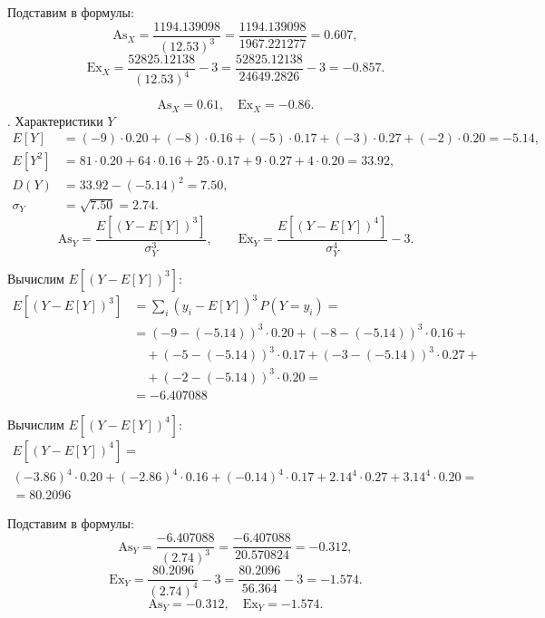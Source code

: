 \documentclass[a4paper,14pt]{extarticle}
\begin{document}
        Подставим в формулы:
        \[
        \mathrm{As}_X = \frac{1194.139098}{(12.53)^3} = \frac{1194.139098}{1967.221277} = 0.607,
        \]
        \[
        \mathrm{Ex}_X = \frac{52825.12138}{(12.53)^4} - 3 = \frac{52825.12138}{24649.2826} - 3 = -0.857.
        \]

        \[
        \boxed{\mathrm{As}_X = 0.61, \quad \mathrm{Ex}_X = -0.86.}
        \]
        . Характеристики $Y$
        \[
        \begin{aligned}
        E[Y] &= (-9)\cdot0.20 + (-8)\cdot0.16 + (-5)\cdot0.17 + (-3)\cdot0.27 + (-2)\cdot0.20 = -5.14,\\
        E[Y^2] &= 81\cdot0.20 + 64\cdot0.16 + 25\cdot0.17 + 9\cdot0.27 + 4\cdot0.20 = 33.92,\\
        D(Y) &= 33.92 - (-5.14)^2 = 7.50,\\
        \sigma_Y &= \sqrt{7.50} = 2.74.
        \end{aligned}
        \]
        \[
        \mathrm{As}_Y = \frac{E[(Y - E[Y])^3]}{\sigma_Y^3}, 
        \qquad
        \mathrm{Ex}_Y = \frac{E[(Y - E[Y])^4]}{\sigma_Y^4} - 3.
        \]

        Вычислим $E[(Y - E[Y])^3]$:
        \[
        \begin{aligned}
        E[(Y - E[Y])^3] &= \sum_i (y_i - E[Y])^3 \, P(Y=y_i) = \\
        &= (-9 - (-5.14))^3 \cdot 0.20 + (-8 - (-5.14))^3 \cdot 0.16 + \\
        &\quad + (-5 - (-5.14))^3 \cdot 0.17 + (-3 - (-5.14))^3 \cdot 0.27 + \\
        &\quad + (-2 - (-5.14))^3 \cdot 0.20 = \\
        & = -6.407088
        \end{aligned}
        \]

        Вычислим $E[(Y - E[Y])^4]$:
        \begin{gather*}
        E[(Y - E[Y])^4] = \\
        (-3.86)^4 \cdot 0.20 + (-2.86)^4 \cdot 0.16 + (-0.14)^4 \cdot 0.17 + 2.14^4 \cdot 0.27 + 3.14^4 \cdot 0.20 = \\
        = 80.2096
        \end{gather*}

        Подставим в формулы:
        \[
        \mathrm{As}_Y = \frac{-6.407088}{(2.74)^3} = \frac{-6.407088}{20.570824} = -0.312,
        \]
        \[
        \mathrm{Ex}_Y = \frac{ 80.2096}{(2.74)^4} - 3 = \frac{ 80.2096}{56.364} - 3 = -1.574.
        \]
        \[
        \boxed{\mathrm{As}_Y = -0.312, \quad \mathrm{Ex}_Y = -1.574.}
        \]
\end{document}
